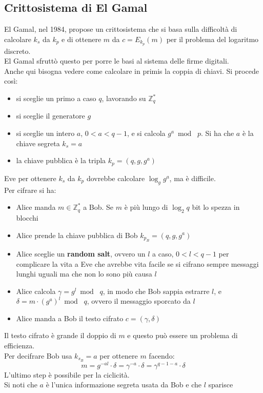 \documentclass[a4paper,12pt, oneside]{book}
\begin{document}
\subsection{Crittosistema di El Gamal}
El Gamal, nel 1984, propose un crittosistema che si basa sulla difficoltà di
calcolare $k_s$ da $k_p$ e di ottenere $m$ da $c=E_{k_p}(m)$ per il problema del
logaritmo discreto.\\
El Gamal sfruttò questo per porre le basi al sistema delle firme digitali. \\
Anche qui bisogna vedere come calcolare in primis la coppia di chiavi.
Si procede così:
\begin{itemize}
  \item si sceglie un primo a caso $q$, lavorando su $\mathbb{Z}_q^*$
  \item si sceglie il generatore $g$
  \item si sceglie un intero $a$, $0<a<q-1$, e si calcola $g^a\bmod\,\,p$. Si ha
  che $a$ è la chiave segreta $k_s=a$
  \item la chiave pubblica è la tripla $k_p=(q,g,g^a)$
\end{itemize}
Eve per ottenere $k_s$ da $k_p$ dovrebbe calcolare $\log_g g^a$, ma è
difficile.\\
Per cifrare si ha:
\begin{itemize}
  \item Alice manda $m\in\mathbb{Z}_q^*$ a Bob. Se $m$ è più lungo di $\log_2 q$
  bit lo spezza in blocchi 
  \item Alice prende la chiave pubblica di Bob $k_{p_B}=(q,g,g^a)$
  \item Alice sceglie un \textbf{random salt}, ovvero un $l$ a caso, $0<l<q-1$
  per complicare la vita a Eve che avrebbe vita facile se si cifrano sempre
  messaggi lunghi uguali ma che non lo sono più causa $l$
  \item Alice calcola $\gamma=g^l\bmod \,\,q$, in modo che Bob sappia estrarre
  $l$, e $\delta=m\cdot (g^a)^l\bmod\,\,q$, ovvero il messaggio sporcato da $l$
  \item Alice manda a Bob il testo cifrato $c=(\gamma,\delta)$
\end{itemize}
Il testo cifrato è grande il doppio di $m$ e questo può essere un problema di
efficienza.\\
Per decifrare Bob usa $k_{s_B}=a$ per ottenere $m$ facendo: 
\[m=g^{-al}\cdot \delta=\gamma^{-a}\cdot \delta=\gamma^{q-1-a}\cdot \delta\]
L'ultimo step è possibile per la ciclicità.\\
Si noti che $a$ è l'unica informazione segreta usata da Bob e che $l$ sparisce
\end{document}
